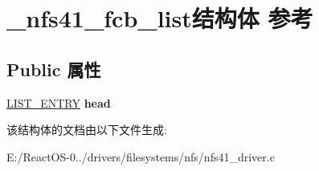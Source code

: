 \hypertarget{struct__nfs41__fcb__list}{}\section{\+\_\+nfs41\+\_\+fcb\+\_\+list结构体 参考}
\label{struct__nfs41__fcb__list}
\subsection*{Public 属性}
\begin{DoxyCompactItemize}
\item 
\mbox{\label{struct__nfs41__fcb__list_af005286e1367df299d50a948ec4d008d}} 
\hyperlink{struct___l_i_s_t___e_n_t_r_y}{L\+I\+S\+T\+\_\+\+E\+N\+T\+RY} {\bfseries head}
\end{DoxyCompactItemize}


该结构体的文档由以下文件生成\+:\begin{DoxyCompactItemize}
\item 
E\+:/\+React\+O\+S-\/0../drivers/filesystems/nfs/nfs41\+\_\+driver.\+c\end{DoxyCompactItemize}
